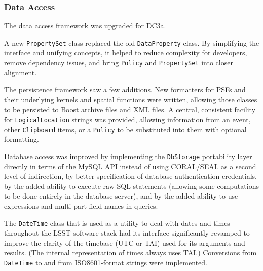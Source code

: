 
\subsubsection{Data Access}

The data access framework was upgraded for DC3a.

A new {\tt PropertySet} class replaced the old {\tt DataProperty} class.
By simplifying the interface and unifying concepts, it helped to reduce
complexity for developers, remove dependency issues, and bring
{\tt Policy} and {\tt PropertySet} into closer alignment.

The persistence framework saw a few additions.  New formatters for PSFs
and their underlying kernels and spatial functions were written,
allowing those classes to be persisted to Boost archive files and XML
files.  A central, consistent facility for {\tt LogicalLocation} strings
was provided, allowing information from an event, other {\tt Clipboard}
items, or a {\tt Policy} to be substituted into them with optional
formatting.

Database access was improved by implementing the {\tt DbStorage}
portability layer directly in terms of the MySQL API instead of using
CORAL/SEAL as a second level of indirection, by better specification of
database authentication credentials, by the added ability to execute raw
SQL statements (allowing some computations to be done entirely in the
database server), and by the added ability to use expressions and
multi-part field names in queries.

The {\tt DateTime} class that is used as a utility to deal with dates and
times throughout the LSST software stack had its interface significantly
revamped to improve the clarity of the timebase (UTC or TAI) used for
its arguments and results.  (The internal representation of times always
uses TAI.)  Conversions from {\tt DateTime} to and from ISO8601-format
strings were implemented.

